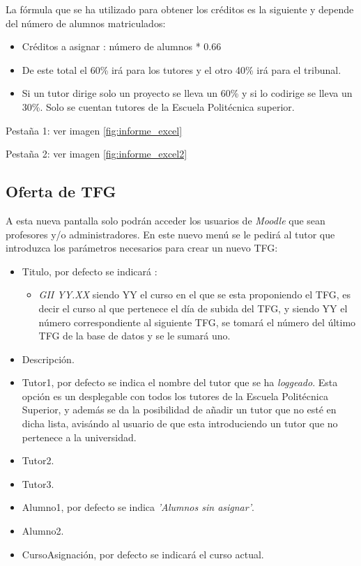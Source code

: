 La fórmula que se ha utilizado para obtener los créditos es la siguiente y depende del número de alumnos matriculados:
\begin{itemize}
	\item Créditos a asignar : número de alumnos * 0.66
	\item De este total el 60\% irá para los tutores y el otro 40\% irá para el tribunal.
	\item Si un tutor dirige solo un proyecto se lleva un 60\% y si lo codirige se lleva un 30\%. Solo se cuentan tutores de la Escuela Politécnica superior.
\end{itemize}
Pestaña 1: ver imagen \ref{fig:informe_excel}

Pestaña 2: ver imagen \ref{fig:informe_excel2}

\subsection{Oferta de TFG}

A esta nueva pantalla solo podrán acceder los usuarios de \emph{Moodle} que sean profesores y/o administradores.
En este nuevo menú se le pedirá al tutor que introduzca los parámetros necesarios para crear un nuevo TFG:

\begin{itemize}
	\item Titulo, por defecto se indicará :
	\begin{itemize}
		\item \emph{GII YY.XX} siendo YY el curso en el que se esta proponiendo el TFG, es decir el curso al que pertenece el día de subida del TFG, y siendo YY el número correspondiente al siguiente TFG, se tomará el número del último TFG de la base de datos y se le sumará uno.
	\end{itemize}
	\item Descripción.
	\item Tutor1, por defecto se indica el nombre del tutor que se ha \emph{loggeado}. Esta opción es un desplegable con todos los tutores de la Escuela Politécnica Superior, y además se da la posibilidad de añadir un tutor que no esté en dicha lista, avisándo al usuario de que esta introduciendo un tutor que no pertenece a la universidad.
	\item Tutor2.
	\item Tutor3.
	\item Alumno1, por defecto se indica \emph{'Alumnos sin asignar'}.
	\item Alumno2.
	\item CursoAsignación, por defecto se indicará el curso actual.
\end{itemize}


